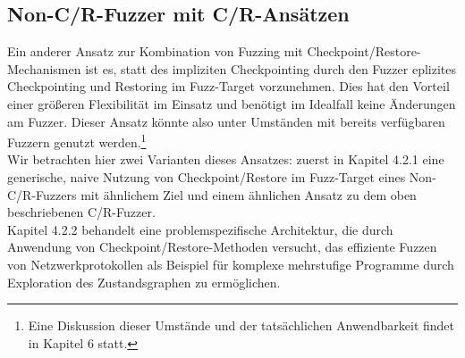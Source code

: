 \documentclass[a4paper]{article}
\begin{document}
\subsection{Non-C/R-Fuzzer mit C/R-Ansätzen}
Ein anderer Ansatz zur Kombination von Fuzzing mit Checkpoint/Restore-Mechanismen ist es, statt des impliziten Checkpointing durch den Fuzzer eplizites Checkpointing und Restoring im Fuzz-Target vorzunehmen.
Dies hat den Vorteil einer größeren Flexibilität im Einsatz und benötigt im Idealfall keine Änderungen am Fuzzer. Dieser Ansatz könnte also unter Umständen mit bereits verfügbaren Fuzzern genutzt werden.\footnote{Eine Diskussion dieser Umstände und der tatsächlichen Anwendbarkeit findet in Kapitel 6 statt.}\\
Wir betrachten hier zwei Varianten dieses Ansatzes: zuerst in Kapitel 4.2.1 eine generische, naive Nutzung von Checkpoint/Restore im Fuzz-Target eines Non-C/R-Fuzzers mit ähnlichem Ziel und einem ähnlichen Ansatz zu dem oben beschriebenen C/R-Fuzzer.\\
Kapitel 4.2.2 behandelt eine problemspezifische Architektur, die durch Anwendung von Checkpoint/Restore-Methoden versucht, das effiziente Fuzzen von Netzwerkprotokollen als Beispiel für komplexe mehrstufige Programme durch Exploration des Zustandsgraphen zu ermöglichen.
\end{document}
